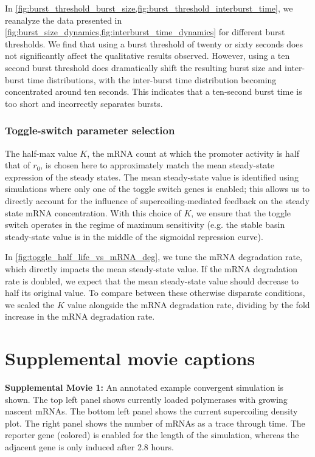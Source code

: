 \documentclass[11pt]{article} %
\begin{document}
In \cref{fig:burst_threshold_burst_size,fig:burst_threshold_interburst_time}, we reanalyze the data presented in \cref{fig:burst_size_dynamics,fig:interburst_time_dynamics} for different burst thresholds. We find that using a burst threshold of twenty or sixty seconds does not significantly affect the qualitative results observed. However, using a ten second burst threshold does dramatically shift the resulting burst size and inter-burst time distributions, with the inter-burst time distribution becoming concentrated around ten seconds. This indicates that a ten-second burst time is too short and incorrectly separates bursts.

\subsubsection{Toggle-switch parameter selection} \label{sec:supp:choice_of_k}
The half-max value \(K\), the mRNA count at which the promoter activity is half that of \(r_0\), is chosen here to approximately match the mean steady-state expression of the steady states. The mean steady-state value is identified using simulations where only one of the toggle switch genes is enabled; this allows us to directly account for the influence of supercoiling-mediated feedback on the steady state mRNA concentration. With this choice of \(K\), we ensure that the toggle switch operates in the regime of maximum sensitivity (e.g. the stable basin steady-state value is in the middle of the sigmoidal repression curve).

 In \cref{fig:toggle_half_life_vs_mRNA_deg}, we tune the mRNA degradation rate, which directly impacts the mean steady-state value. If the mRNA degradation rate is doubled, we expect that the mean steady-state value should decrease to half its original value. To compare between these otherwise disparate conditions, we scaled the \(K\) value alongside the mRNA degradation rate, dividing by the fold increase in the mRNA degradation rate.


\section{Supplemental movie captions}

{\small \noindent \textbf{Supplemental Movie 1:} An annotated example convergent simulation is shown. The top left panel shows currently loaded polymerases with growing nascent mRNAs. The bottom left panel shows the current supercoiling density plot. The right panel shows the number of mRNAs as a trace through time. The reporter gene (colored) is enabled for the length of the simulation, whereas the adjacent gene is only induced after 2.8 hours.}
\end{document}
